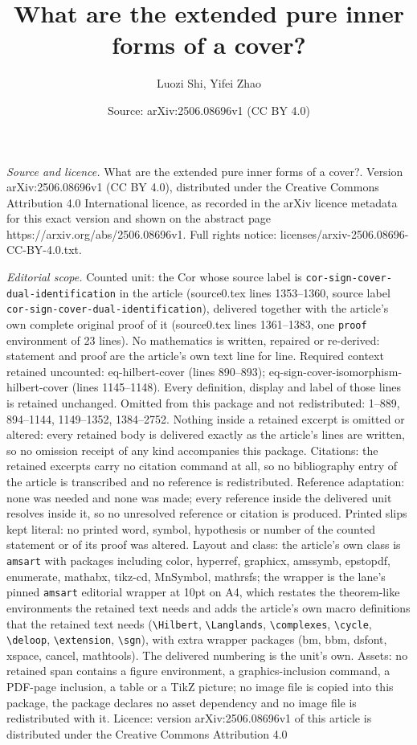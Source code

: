 \documentclass[10pt,a4paper]{amsart}
\title[What are the extended pure inner forms of a cover?]{What are the extended pure inner forms of a cover?}
\author{Luozi Shi, Yifei Zhao}
\date{Source: arXiv:2506.08696v1 (CC BY 4.0)}
\begin{document}
\maketitle

\noindent\emph{Source and licence.} What are the extended pure inner forms of a cover?. Version arXiv:2506.08696v1 (CC BY 4.0), distributed under the Creative Commons Attribution 4.0 International licence, as recorded in the arXiv licence metadata for this exact version and shown on the abstract page https://arxiv.org/abs/2506.08696v1. Full rights notice: licenses/arxiv-2506.08696-CC-BY-4.0.txt.\par\smallskip

\noindent\textit{Editorial scope.} Counted unit: the Cor whose source label is \texttt{cor-sign-cover-dual-identification} in the article (source0.tex lines 1353--1360, source label \texttt{cor-sign-cover-dual-identification}), delivered together with the article's own complete original proof of it (source0.tex lines 1361--1383, one \texttt{proof} environment of 23 lines). No mathematics is written, repaired or re-derived: statement and proof are the article's own text line for line. Required context retained uncounted: eq-hilbert-cover (lines 890--893); eq-sign-cover-isomorphism-hilbert-cover (lines 1145--1148). Every definition, display and label of those lines is retained unchanged. Omitted from this package and not redistributed: 1--889, 894--1144, 1149--1352, 1384--2752. Nothing inside a retained excerpt is omitted or altered: every retained body is delivered exactly as the article's lines are written, so no omission receipt of any kind accompanies this package. Citations: the retained excerpts carry no citation command at all, so no bibliography entry of the article is transcribed and no reference is redistributed. Reference adaptation: none was needed and none was made; every reference inside the delivered unit resolves inside it, so no unresolved reference or citation is produced. Printed slips kept literal: no printed word, symbol, hypothesis or number of the counted statement or of its proof was altered. Layout and class: the article's own class is \texttt{amsart} with packages including color, hyperref, graphicx, amssymb, epstopdf, enumerate, mathabx, tikz-cd, MnSymbol, mathrsfs; the wrapper is the lane's pinned \texttt{amsart} editorial wrapper at 10pt on A4, which restates the theorem-like environments the retained text needs and adds the article's own macro definitions that the retained text needs (\texttt{\textbackslash Hilbert}, \texttt{\textbackslash Langlands}, \texttt{\textbackslash complexes}, \texttt{\textbackslash cycle}, \texttt{\textbackslash deloop}, \texttt{\textbackslash extension}, \texttt{\textbackslash sgn}), with extra wrapper packages (bm, bbm, dsfont, xspace, cancel, mathtools). The delivered numbering is the unit's own. Assets: no retained span contains a figure environment, a graphics-inclusion command, a PDF-page inclusion, a table or a TikZ picture; no image file is copied into this package, the package declares no asset dependency and no image file is redistributed with it. Licence: version arXiv:2506.08696v1 of this article is distributed under the Creative Commons Attribution 4.0 
\end{document}
